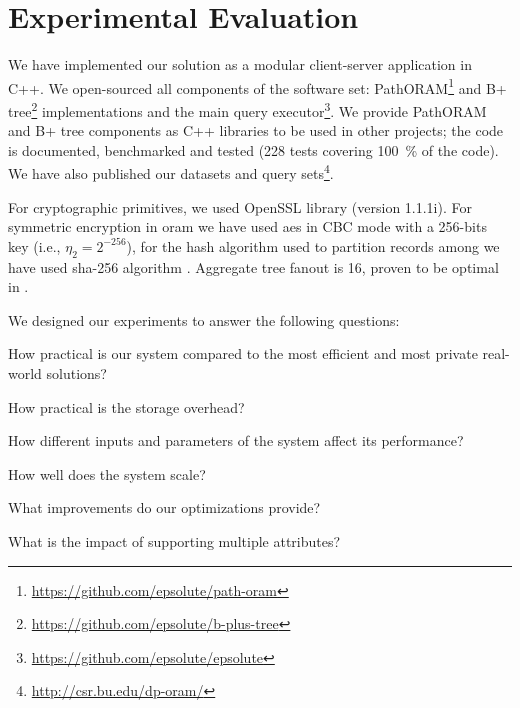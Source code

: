 \section{Experimental Evaluation}\label{section:range-persistent:experiments}

	We have implemented our solution as a modular client-server application in C++.
	We open-sourced all components of the software set: PathORAM\footnote{\url{https://github.com/epsolute/path-oram}} and B+ tree\footnote{\url{https://github.com/epsolute/b-plus-tree}} implementations and the main query executor\footnote{\url{https://github.com/epsolute/epsolute}}.
	We provide PathORAM and B+ tree components as C++ libraries to be used in other projects; the code is documented, benchmarked and tested (228 tests covering \SI{100}{\percent} of the code).
	We have also published our datasets and query sets\footnote{\url{http://csr.bu.edu/dp-oram/}}.

	For cryptographic primitives, we used OpenSSL library (version 1.1.1i).
	For symmetric encryption in \acrshort{oram} we have used \acrshort{aes} in CBC mode \cite{aes-nist,nist-modes} with a 256-bits key (i.e., $\eta_2 = 2^{-256}$), for the hash algorithm  used to partition records among  we have used \acrshort{sha}-256 algorithm \cite{nist-hash}.
	Aggregate tree fanout \fanout{} is 16, proven to be optimal in \cite{hierarchical-methods-for-dp}.

	We designed our experiments to answer the following questions:
	\newlength{\questionLength}
	\settowidth{\questionLength}{Question-5}
	\begin{description}[
		font=\bfseries,
		leftmargin=\dimexpr\questionLength+1.0em\relax,
		labelindent=0pt,
		labelwidth=\questionLength%
	]
		\item[Question-1\label{item:question-practicality}] How practical is our system compared to the most efficient and most private real-world solutions?
		\item[Question-2\label{item:question-storage}] How practical is the storage overhead?
		\item[Question-3\label{item:question-parameters}] How different inputs and parameters of the system affect its performance?
		\item[Question-4\label{item:question-scalability}] How well does the system scale?
		\item[Question-5\label{item:question-optimizations}] What improvements do our optimizations provide?
		\item[Question-6\label{item:question-attributes}] What is the impact of supporting multiple attributes?
	\end{description}

